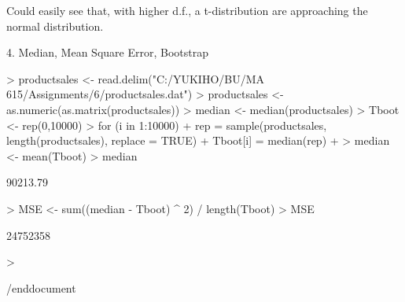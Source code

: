 Could easily see that, with higher d.f., a t-distribution are approaching the normal distribution.

4. Median, Mean Square Error, Bootstrap

\begin{Schunk}
\begin{Sinput}
> productsales <- read.delim("C:/YUKIHO/BU/MA 615/Assignments/6/productsales.dat")
> productsales <- as.numeric(as.matrix(productsales))
> median <- median(productsales)
> Tboot <- rep(0,10000)
> for (i in 1:10000){
+   rep = sample(productsales, length(productsales), replace = TRUE)
+   Tboot[i] = median(rep)
+   }
> median <- mean(Tboot)
> median
\end{Sinput}
\begin{Soutput}
[1] 90213.79
\end{Soutput}
\begin{Sinput}
> MSE <- sum((median - Tboot) ^ 2) / length(Tboot)
> MSE
\end{Sinput}
\begin{Soutput}
[1] 24752358
\end{Soutput}
\begin{Sinput}
> 
\end{Sinput}
\end{Schunk}

/end{document}
